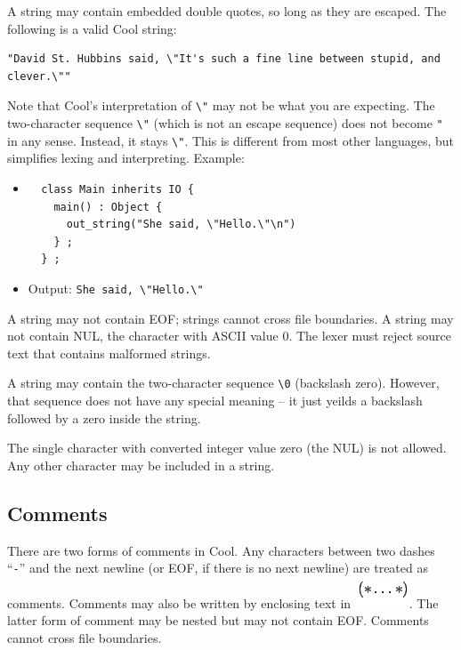 \documentclass[]{article}
\begin{document}
A string may contain embedded double quotes, so long as they are
escaped. The following is a valid Cool string:

\begin{verbatim}
"David St. Hubbins said, \"It's such a fine line between stupid, and clever.\""
\end{verbatim}

Note that Cool's interpretation of \texttt{\textbackslash{}"} may not be
what you are expecting. The two-character sequence
\texttt{\textbackslash{}"} (which is not an escape sequence) does not
become \texttt{"} in any sense. Instead, it stays
\texttt{\textbackslash{}"}. This is different from most other languages,
but simplifies lexing and interpreting. Example:

\begin{itemize}
\item
\begin{verbatim}
  class Main inherits IO {
    main() : Object { 
      out_string("She said, \"Hello.\"\n") 
    } ;
  } ; 
\end{verbatim}
\item
  Output: \texttt{She said, \textbackslash{}"Hello.\textbackslash{}"}
\end{itemize}

A string may not contain EOF; strings cannot cross file boundaries. A
string may not contain NUL, the character with ASCII value 0. The lexer
must reject source text that contains malformed strings.

A string may contain the two-character sequence
\texttt{\textbackslash{}0} (backslash zero). However, that sequence does
not have any special meaning -- it just yeilds a backslash followed by a
zero inside the string.

The single character with converted integer value zero (the NUL) is not
allowed. Any other character may be included in a string.

\subsection{Comments}

There are two forms of comments in Cool. Any characters between two
dashes ``\texttt{-}'' and the next newline (or EOF, if there is no next
newline) are treated as comments. Comments may also be written by
enclosing text in \includegraphics{img37.png}. The latter form of
comment may be nested but may not contain EOF. Comments cannot cross
file boundaries.
\end{document}
